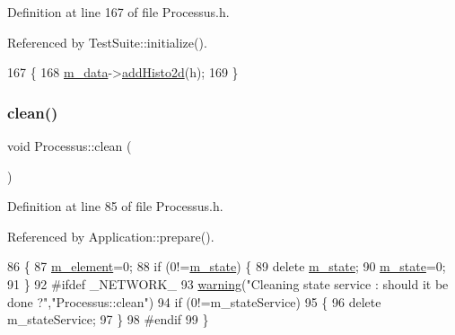 Definition at line 167 of file Processus.\+h.



Referenced by Test\+Suite\+::initialize().


\begin{DoxyCode}
167                            \{
168     \hyperlink{classProcessus_a3da9a9de8af54e2f47807a3e09dfccff}{m\_data}->\hyperlink{classData_a4bef9c956f3994bfa491f94f4821704c}{addHisto2d}(h);
169   \}
\end{DoxyCode}
\mbox{\label{classProcessus_aaeb17673b98d2b39f3aa780e335e0968}} 
\subsubsection{\texorpdfstring{clean()}{clean()}}
{\footnotesize\ttfamily void Processus\+::clean (\begin{DoxyParamCaption}{ }\end{DoxyParamCaption})\hspace{0.3cm}{\ttfamily [inline]}}



Definition at line 85 of file Processus.\+h.



Referenced by Application\+::prepare().


\begin{DoxyCode}
86   \{
87     \hyperlink{classProcessus_aa9d24d53c3e52f36786cabb5d8e296e7}{m\_element}=0;
88     \textcolor{keywordflow}{if} (0!=\hyperlink{classProcessus_ab3539eee42891ceae0baf4395ae7fb61}{m\_state}) \{
89       \textcolor{keyword}{delete} \hyperlink{classProcessus_ab3539eee42891ceae0baf4395ae7fb61}{m\_state};
90       \hyperlink{classProcessus_ab3539eee42891ceae0baf4395ae7fb61}{m\_state}=0;
91     \}
92 \textcolor{preprocessor}{#ifdef \_NETWORK\_
}
93     \hyperlink{classObject_a65cd4fda577711660821fd2cd5a3b4c9}{warning}(\textcolor{stringliteral}{"Cleaning state service : should it be done ?"},\textcolor{stringliteral}{"Processus::clean"})
94       if (0!=m\_stateService)
95       \{
96         \textcolor{keyword}{delete} m\_stateService;
97       \}
98 \textcolor{preprocessor}{#endif
}
99   \}
\end{DoxyCode}
\mbox{\label{classProcessus_aca8856f6d6d7b7e1fe941f298dcbb502}} 
